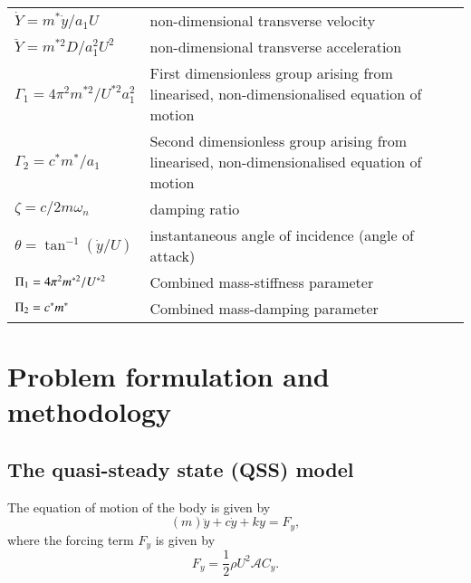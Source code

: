 \begin{tabular}{ll}
$\dot{Y}=m^*\dot{y}/a_1U$ & non-dimensional transverse velocity \\
$\ddot{Y}=m^{*2}D/a_1^2U^2$ & non-dimensional transverse acceleration \\
$\Gamma_1 = 4\pi^2m^{*2}/U^{*2}a_1^2$ & First dimensionless group arising from linearised, non-dimensionalised equation of motion\\
$\Gamma_2 = c^*m^*/a_1$ & Second dimensionless group arising from linearised, non-dimensionalised equation of motion\\
$\zeta= c/2 m \omega_n$ & damping ratio \\
$\theta= \tan^{-1}{(\dot{y}/U)}$ & instantaneous angle of incidence (angle of attack)\\
$\Pi_1 =  4\pi^2m^{*2}/U^{*2}$ & Combined mass-stiffness parameter\\
$\Pi_2 = c^*m^*$ & Combined mass-damping parameter\\
\end{tabular}  



\section{Problem formulation and methodology}
\label{sec:theory}

\subsection{The quasi-steady state (QSS) model}

The equation of motion of the body is given by 
\begin{equation}
\label{equationofmotion}
(m)\ddot{y}+c\dot{y}+ky=F_y,
\end{equation}
where the forcing term $F_y$ is given by
\begin{equation}
\label{lift equation}
F_y=\frac{1}{2}\rho U^2\mathcal{A}C_y.
\end{equation}




